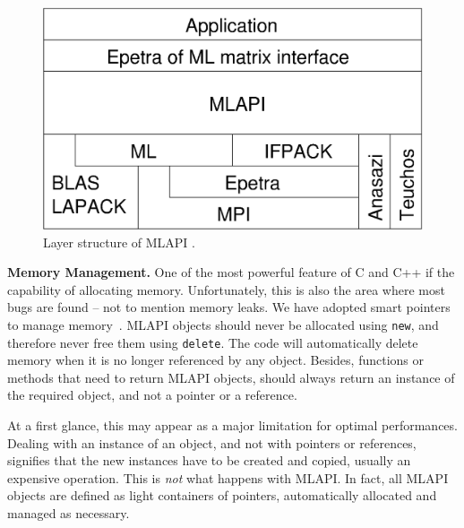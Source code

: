 \documentclass{article}[11pt]
\newcommand{\teuchos}  {{\sc Teuchos}}
\newcommand{\MLAPI}  {{\sc MLAPI }}
\newcommand{\MLAPIns}  {{\sc MLAPI}}
\begin{document}
\begin{figure}
\begin{center}
\includegraphics[width=12cm]{layer.eps}
\caption{Layer structure of \MLAPI.}
\label{fig:layer}
\end{center}
\end{figure}

\bigskip

\noindent
{\bf Memory Management.} One of the most powerful feature of C and C++
if the capability of allocating memory. Unfortunately, this is also the
area where most bugs are found -- not to mention memory leaks. We have adopted
smart pointers to manage memory~\cite{barlett04teuchos}.
\MLAPI objects should never be allocated using {\tt new}, and therefore never
free them using {\tt delete}. The code will automatically delete memory
when it is no longer referenced by any object. Besides, functions or methods
that need to return \MLAPI objects, should always return an instance of the
required object, and not a pointer or a reference.

\noindent
At a first glance, this may appear as a major limitation for optimal
performances. Dealing with an instance of an object, and not with pointers or
references, signifies that the new instances have to be created and copied,
usually an expensive operation. This is {\sl not} what happens with \MLAPIns. In
fact, all \MLAPI objects are defined as light containers of pointers,
  automatically allocated and managed as necessary. 
\end{document}
